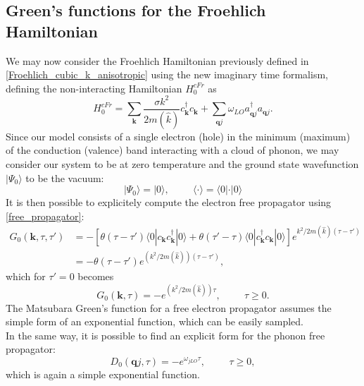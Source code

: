 \documentclass[12pt, a4paper]{report}
\numberwithin{equation}{section}
\begin{document}
\subsection{Green's functions for the Froehlich Hamiltonian}
We may now consider the Froehlich Hamiltonian previously defined in \ref{Froehlich_cubic_k_anisotropic} using the new imaginary time formalism,
defining the non-interacting Hamiltonian $H^{cFr}_0$ as 
\begin{equation}
    H^{cFr}_0=\sum_\mathbf{k}\frac{\sigma k^2}{2m(\hat{k})}c^\dagger_{\mathbf{k}}c_\mathbf{k}+\sum_{\mathbf{q}j}\omega_{LO}a^\dagger_{\mathbf{q}j}a_{\mathbf{q}j}.
    \label{polaron_non-interacting}
\end{equation}
Since our model consists of a single electron (hole) in the minimum (maximum) of the conduction (valence) band interacting with a cloud of phonon, we may 
consider our system to be at zero temperature and the ground state wavefunction $|\Psi_0\rangle$ to be the vacuum:
\begin{equation}
    |\Psi_0\rangle=|0\rangle,\hspace{1cm}\langle \cdot \rangle=\langle 0|\cdot|0\rangle
\end{equation}
It is then possible to explicitely compute the electron free propagator using \ref{free_propagator}:
\begin{equation}
\begin{split}
    G_0(\mathbf{k},\tau,\tau')&=-\left[\theta(\tau-\tau')\langle 0| c_\mathbf{k}c^\dagger_\mathbf{k}|0\rangle+\theta(\tau'-\tau)\langle 0 | c^\dagger_\mathbf{k}c_\mathbf{k}|0\rangle\right]e^{k^2/2m(\hat{k})(\tau-\tau')}\\
    &=-\theta(\tau-\tau')e^{(k^2/2m(\hat{k}))(\tau-\tau')},
\end{split}
\end{equation}
which for $\tau'=0$ becomes
\begin{equation}
    G_0(\mathbf{k},\tau)=-e^{(k^2/2m(\hat{k}))\tau},\hspace{1cm}\tau\ge0.
\end{equation}
The Matsubara Green's function for a free electron propagator assumes the simple form of an exponential function, which can be easily sampled.\\
In the same way, it is possible to find an explicit form for the phonon free propagator:
\begin{equation}
    D_0(\mathbf{q}j,\tau)=-e^{\omega_{jLO}\tau},\hspace{1cm}\tau\ge0,
\end{equation}
which is again a simple exponential function.
\printbibliography
\end{document}
